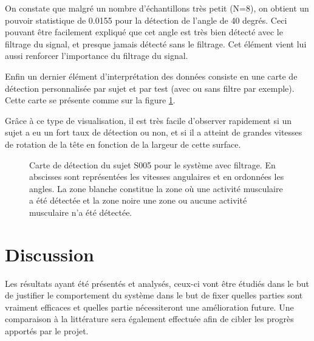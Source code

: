 \documentclass[letterpaper, twoside, 12pt, memoire, creativecommons, hyperref]{thETS}
\begin{document}
On constate que malgré un nombre d'échantillons très petit (N=8), on obtient un pouvoir statistique de 0.0155 pour la détection de l'angle de 40 degrés. Ceci pouvant être facilement expliqué que cet angle est très bien détecté avec le filtrage du signal, et presque jamais détecté sans le filtrage. Cet élément vient lui aussi renforcer l'importance du filtrage du signal.

Enfin un dernier élément d'interprétation des données consiste en une carte de détection personnalisée par sujet et par test (avec ou sans filtre par exemple).
Cette carte se présente comme sur la figure \ref{fig:cartedetection}.

Grâce à ce type de visualisation, il est très facile d'observer rapidement si un sujet a eu un fort taux de détection ou non, et si il a atteint de grandes vitesses de rotation de la tête en fonction de la largeur de cette surface.

\begin{figure}
	\centering
	\caption{Carte de détection du sujet S005 pour le système avec filtrage. En abscisses sont représentées les vitesses angulaires et en ordonnées les angles. La zone blanche constitue la zone où une activité musculaire a été détectée et la zone noire une zone ou aucune activité musculaire n'a été détectée.}
	\label{fig:cartedetection}
\end{figure}


\chapter{Discussion}

Les résultats ayant été présentés et analysés, ceux-ci vont être étudiés dans le but de justifier le comportement du système dans le but de fixer quelles parties sont vraiment efficaces et quelles partie nécessiteront une amélioration future. Une comparaison à la littérature sera également effectuée afin de cibler les progrès apportés par le projet.
\end{document}
